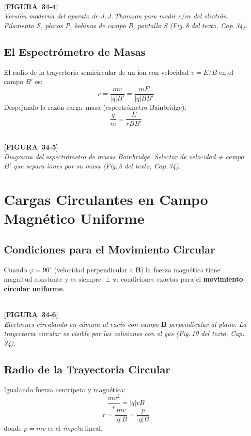 \documentclass[12pt, letterpaper]{report}
\numberwithin{equation}{section}
\newcommand{\vB}[1]{\boldsymbol{#1}}          %
\newcommand{\figplaceholder}[2]{%
  \begin{tcolorbox}[figbox]
    \centering
    \textcolor{NavyBlue!50}{\rule{0pt}{2.8cm}}\\[4pt]
    {\small\color{NavyBlue}\textbf{[FIGURA\ #1]}\\[2pt]
    \textit{#2}}
  \end{tcolorbox}
}
\begin{document}
\figplaceholder{34-4}{Versión moderna del aparato de J.\,J.\,Thomson para medir
$e/m$ del electrón. Filamento F, placas P, bobinas de campo B, pantalla S
(Fig.\,8 del texto, Cap.\,34).}

\subsection{El Espectrómetro de Masas}

El radio de la trayectoria semicircular de un ion con velocidad $v=E/B$ en el
campo $B'$ es:
\[
  r = \frac{mv}{|q|B'} = \frac{mE}{|q|BB'}
\]
Despejando la razón carga–masa (espectrómetro Bainbridge):
\begin{equation}
  \boxed{\frac{q}{m} = \frac{E}{rBB'}}
  \label{eq:masspectrometer}
\end{equation}

\figplaceholder{34-5}{Diagrama del espectrómetro de masas Bainbridge. Selector de
velocidad + campo $B'$ que separa iones por su masa
(Fig.\,9 del texto, Cap.\,34).}

\section{Cargas Circulantes en Campo Magnético Uniforme}

\subsection{Condiciones para el Movimiento Circular}

Cuando $\varphi=90^\circ$ (velocidad perpendicular a $\vB{B}$) la fuerza
magnética tiene magnitud constante y es siempre $\perp\vB{v}$: condiciones
exactas para el \textbf{movimiento circular uniforme}.

\figplaceholder{34-6}{Electrones circulando en cámara al vacío con campo $\vB{B}$
perpendicular al plano. La trayectoria circular es visible por las
colisiones con el gas (Fig.\,10 del texto, Cap.\,34).}

\subsection{Radio de la Trayectoria Circular}

Igualando fuerza centrípeta y magnética:
\[
  \frac{mv^2}{r} = |q|vB
\]
\begin{equation}
  \boxed{r = \frac{mv}{|q|B} = \frac{p}{|q|B}}
  \label{eq:radiocircular}
\end{equation}
donde $p=mv$ es el \textit{ímpetu} lineal.
\end{document}
